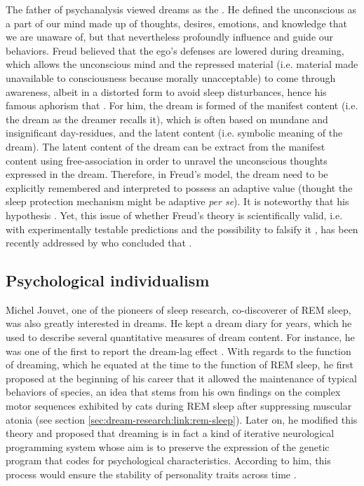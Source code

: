 The father of psychanalysis viewed dreams as the  \citep{freud_interpretation_1900}. He defined the unconscious as a part of our mind made up of thoughts, desires, emotions, and knowledge that we are unaware of, but that nevertheless profoundly influence and guide our behaviors. Freud believed that the ego’s defenses are lowered during dreaming, which allows the unconscious mind and the repressed material (i.e. material made unavailable to consciousness because morally unacceptable) to come through awareness, albeit in a distorted form to avoid sleep disturbances, hence his famous aphorism that . For him, the dream is formed of the manifest content (i.e. the dream as the dreamer recalls it), which is often based on mundane and insignificant day-residues, and the latent content (i.e. symbolic meaning of the dream). The latent content of the dream can be extract from the manifest content using free-association in order to unravel the unconscious thoughts expressed in the dream. Therefore, in Freud’s model, the dream need to be explicitly remembered and interpreted to possess an adaptive value (thought the sleep protection mechanism might be adaptive \emph{per se}). It is noteworthy that his hypothesis  \citep{ruby_experimental_2011}. Yet, this issue of whether Freud's theory is scientifically valid, i.e. with experimentally testable predictions and the possibility to falsify it \citep{popper_conjectures_2014}, has been recently addressed by \citet{guenole_dreams_2013} who concluded that .

\subsection{Psychological individualism}
\label{sec:dream-func:history:jouvet}

Michel Jouvet, one of the pioneers of sleep research, co-discoverer of REM sleep, was also greatly interested in dreams. He kept a dream diary for years, which he used to describe several quantitative measures of dream content. For instance, he was one of the first to report the dream-lag effect \citep{jouvet_memoire_1979}. With regards to the function of dreaming, which he equated at the time to the function of REM sleep, he first proposed at the beginning of his career that it allowed the maintenance of typical behaviors of species, an idea that stems from his own findings on the complex motor sequences exhibited by cats during REM sleep after suppressing muscular atonia (see section \ref{sec:dream-research:link:rem-sleep}). Later on, he modified this theory and proposed that dreaming is in fact a kind of iterative neurological programming system whose aim is to preserve the expression of the genetic program that codes for psychological characteristics. According to him, this process would ensure the stability of personality traits across time \citep{jouvet_sommeil_1991}.

